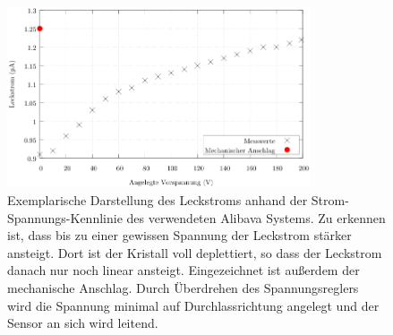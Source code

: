 \begin{figure}
  \centering
  \includegraphics[width=0.8\textwidth]{content/graphics/leckstrom.png}
  \caption{Exemplarische Darstellung des Leckstroms anhand der Strom-Spannungs-Kennlinie des verwendeten Alibava Systems. Zu erkennen ist, dass bis zu einer gewissen Spannung der Leckstrom stärker ansteigt. Dort ist der Kristall voll deplettiert, so dass der Leckstrom danach nur noch linear ansteigt. Eingezeichnet ist außerdem der mechanische Anschlag. Durch Überdrehen des Spannungsreglers wird die Spannung minimal auf Durchlassrichtung angelegt und der Sensor an sich wird leitend.}
  \label{fig:leckstrom}
\end{figure}

















%
